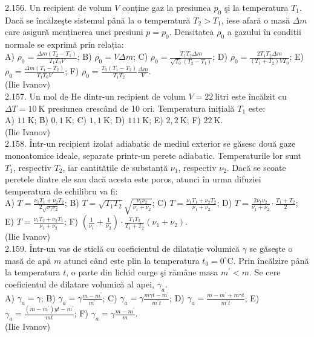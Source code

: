 2.156. Un recipient de volum $V$ conține gaz la presiunea $p_{0}$ şi la temperatura $T_{1}$. Dacă se încălzeşte sistemul până la o temperatură $T_{2}>T_{1}$, iese afară o masă $\Delta m$ care asigură menținerea unei presiuni $p=p_{0}$. Densitatea $\rho_{0}$ a gazului în condiții normale se exprimă prin relația:\\ A) $\rho_{0}=\frac{\Delta m\left(T_{2}-T_{1}\right)}{T_{1} T_{0} V}$; B) $\rho_{0}=V \Delta m$; C) $\rho_{0}=\frac{T_{1} T_{2} \Delta m}{\sqrt{T_{0}}\left(T_{2}-T_{1}\right)}$; D) $\rho_{0}=\frac{2 T_{1} T_{2} \Delta m}{\left(T_{1}+T_{2}\right) V T_{0}}$; E) $\rho_{0}=\frac{\Delta m\left(T_{1}-T_{2}\right)}{T_{1} T_{0} V}$; F) $\rho_{0}=\frac{T_{0}\left(T_{1}-T_{2}\right)}{T_{1} T_{2}} \frac{\Delta m}{V}$.\\ (Ilie Ivanov)\\

2.157. Un mol de He dintr-un recipient de volum $V=22 \mathrm{~litri}$ este încălzit cu $\Delta T=10 \mathrm{~K}$ presiunea crescând de 10 ori. Temperatura inițială $T_{1}$ este:\\ A) $11 \mathrm{~K}$; В) $0,1 \mathrm{~K}$; C) $1,1 \mathrm{~K}$; D) $111 \mathrm{~K}$; E) $2,2 \mathrm{~K}$; F) $22 \mathrm{~K}$.\\ (Ilie Ivanov)\\

2.158. Într-un recipient izolat adiabatic de mediul exterior se găsesc două gaze monoatomice ideale, separate printr-un perete adiabatic. Temperaturile lor sunt $T_{1}$, respectiv $T_{2}$, iar cantitățile de substanță $\nu_{1}$, respectiv $\nu_{2}$. Dacă se scoate peretele dintre ele sau dacă acesta este poros, atunci în urma difuziei temperatura de echilibru va fi:\\ A) $T=\frac{\nu_{1} T_{1}+\nu_{2} T_{2}}{2 \sqrt{\nu_{1} \nu_{2}}}$; B) $T=\sqrt{T_{1} T_{2}} \sqrt{\frac{\nu_{1} \nu_{2}}{\nu_{1}+\nu_{2}}}$; C) $T=\frac{\nu_{1} T_{1}+\nu_{2} T_{2}}{\nu_{1}+\nu_{2}}$; D) $T=\frac{2 \nu_{1} \nu_{2}}{\nu_{1}+\nu_{2}} \cdot \frac{T_{1}+T_{2}}{2}$; E) $T=\frac{\nu_{1} T_{2}+\nu_{2} T_{1}}{\nu_{1}+\nu_{2}}$; F) $\left(\frac{1}{\nu_{1}}+\frac{1}{\nu_{2}}\right) \cdot \frac{T_{1} T_{2}}{T_{1}+T_{2}}\left(\nu_{1}+\nu_{2}\right)$.\\ (Ilie Ivanov)\\

2.159. Într-un vas de sticlă cu coeficientul de dilatație volumică $\gamma$ se găseşte o masă de apă $m$ atunci când este plin la temperatura $t_{0}=0^{\circ} \mathrm{C}$. Prin încălzire până la temperatura $t$, o parte din lichid curge şi rămâne masa $m^{\prime}<m$. Se cere coeficientul de dilatare volumică al apei, $\gamma_{a}$.\\ A) $\gamma_{a}=\gamma$; B) $\gamma_{a}=\gamma \frac{m-m^{\prime}}{m^{\prime}}$; C) $\gamma_{a}=\gamma \frac{m \gamma t-m^{\prime}}{m^{\prime} t}$; D) $\gamma_{a}=\frac{m-m^{\prime}+m \gamma t}{m^{\prime} t}$; E) $\gamma_{a}=\frac{\left(m-m^{\prime}\right) y t-m^{\prime}}{m t}$; F) $\gamma_{a}=\gamma \frac{m-m^{\prime}}{m}$.\\ (Ilie Ivanov)\\

